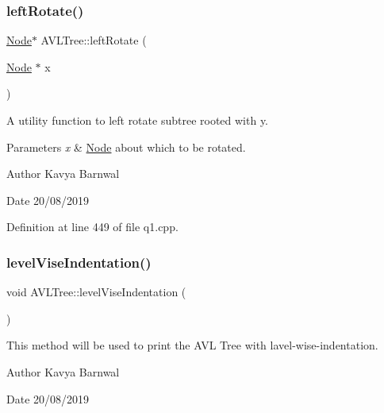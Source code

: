 \subsubsection{\texorpdfstring{left\+Rotate()}{leftRotate()}}
{\footnotesize\ttfamily \hyperlink{class_node}{Node}$\ast$ A\+V\+L\+Tree\+::left\+Rotate (\begin{DoxyParamCaption}\item[{\hyperlink{class_node}{Node} $\ast$}]{x }\end{DoxyParamCaption})\hspace{0.3cm}{\ttfamily [inline]}}

A utility function to left rotate subtree rooted with y. 
\begin{DoxyParams}{Parameters}
{\em x} & \hyperlink{class_node}{Node} about which to be rotated. \\
\hline
\end{DoxyParams}
\begin{DoxyAuthor}{Author}
Kavya Barnwal 
\end{DoxyAuthor}
\begin{DoxyDate}{Date}
20/08/2019 
\end{DoxyDate}


Definition at line 449 of file q1.\+cpp.

\mbox{\label{class_a_v_l_tree_a4717d25b108d9ad8d67258c75e44f696}} 
\subsubsection{\texorpdfstring{level\+Vise\+Indentation()}{levelViseIndentation()}}
{\footnotesize\ttfamily void A\+V\+L\+Tree\+::level\+Vise\+Indentation (\begin{DoxyParamCaption}{ }\end{DoxyParamCaption})\hspace{0.3cm}{\ttfamily [inline]}}

This method will be used to print the A\+VL Tree with lavel-\/wise-\/indentation. \begin{DoxyAuthor}{Author}
Kavya Barnwal 
\end{DoxyAuthor}
\begin{DoxyDate}{Date}
20/08/2019 
\end{DoxyDate}


